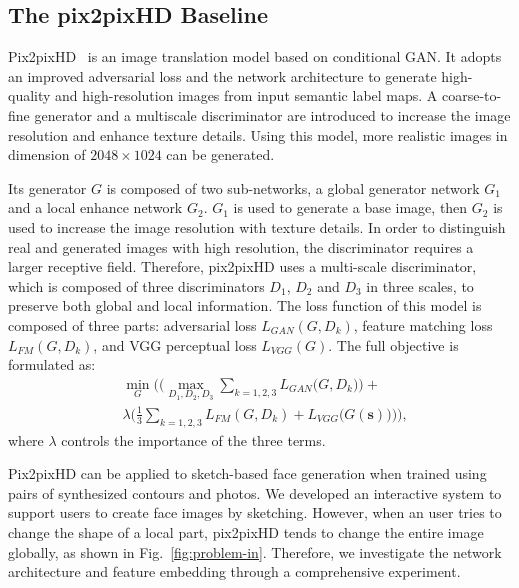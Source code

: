 \documentclass[10pt,twocolumn,letterpaper]{article}
\begin{document}
\subsection{The pix2pixHD Baseline}\label{sec:pix2pixhd}
Pix2pixHD~\cite{pix2pixhd} is an image translation model based on conditional GAN.
It adopts an improved adversarial loss and the network architecture to generate high-quality and high-resolution images from input semantic label maps. 
A coarse-to-fine generator and a multiscale discriminator are introduced to increase the image resolution and enhance texture details.
Using this model, more realistic images in dimension of $2048 \times 1024$ can be generated. 

Its generator $G$ is composed of two sub-networks, a global generator network $G_1$ and a local enhance network $G_2$. 
$G_1$ is used to generate a base image, then $G_2$ is used to increase the image resolution with texture details. 
In order to distinguish real and generated images with high resolution, the discriminator requires a larger receptive field. 
Therefore, pix2pixHD uses a multi-scale discriminator, which is composed of three discriminators $D_1$, $D_2$ and $D_3$ in three scales, to preserve both global and local information. 
The loss function of this model is composed of three parts: adversarial loss $L_{GAN}(G,D_k)$, feature matching loss $L_{FM}(G,D_k)$, and VGG perceptual loss $L_{VGG}(G)$. The full objective is formulated as:
\begin{equation}
\begin{split}
	&\underset{G}{\min}\Bigg(\bigg(\underset{D_1,D_2,D_3}{\max} \sum_{k=1,2,3}{L_{GAN}\big(G,D_k\big)}\bigg)+  \\
	&\lambda \bigg(\frac{1}{3}\sum_{k=1,2,3}{L_{FM}(G,D_k)}+L_{VGG}{\big(G(\boldsymbol{s})\big)}\bigg)\Bigg),
\end{split}
\end{equation}
\noindent
where $\lambda$ controls the importance of the three terms.
 

Pix2pixHD can be applied to sketch-based face generation when trained using pairs of synthesized contours and photos. 
We developed an interactive system to support users to create face images by sketching. 
However, when an user tries to change the shape of a local part, pix2pixHD tends to change the entire image globally, as shown in Fig.~\ref{fig:problem-in}.
Therefore, we investigate the network architecture and feature embedding through a comprehensive experiment.
\end{document}
